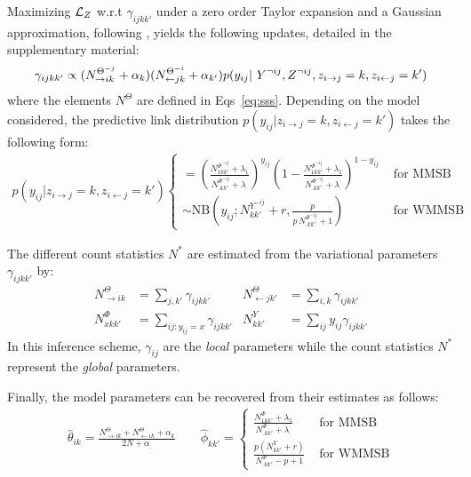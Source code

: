 Maximizing $\mathcal{L}_Z$ w.r.t $\gamma_{ijkk'}$ under a zero order Taylor expansion and a Gaussian approximation, following \cite{teh2006collapsed,asuncion2009smoothing}, yields the following updates, detailed in the supplementary material:
%
\begin{equation} \label{eq:maximization}
\gamma_{ijkk'} \propto (N_{\rightarrow ik}^{\Theta^{-j}} + \alpha_k) (N_{\leftarrow jk}^{\Theta^{-i}} + \alpha_{k'}) p(y_{ij} | Y^{\neg ij}, Z^{\neg ij}, \zij=k, \zji=k')
\end{equation}
%
where the elements $N^{\Theta}$ are defined in Eqs~\eqref{eq:sss}. Depending on the model considered, the predictive link distribution $p(y_{ij}|z_{i \rightarrow j}=k,z_{i \leftarrow j}=k')$ takes the following form:
%
\begin{align*}
p(y_{ij} | z_{i \rightarrow j} = k,z_{i \leftarrow j} = k') \begin{cases}
    = \left( \frac{ N^{\Phi^{-ij}}_{1 kk'} + \lambda_1}{N^{\Phi^{-ij}}_{\bm{.}kk'} + \lambda_{\bm{.}}}\right)^{y_{ij}} \left( 1- \frac{ N^{\Phi^{-ij}}_{1 kk'} + \lambda_1}{N^{\Phi^{-ij}}_{\bm{.}kk'} + \lambda_{\bm{.}}}\right)^{1-y_{ij}}  & \textrm{ for MMSB} \\
    \sim \mathrm{NB}\left(y_{ij}; N^{Y^{-ij}}_{kk'} + r, \frac{p}{p\,N^{\Phi^{-ij}}_{\bm{.}kk'} + 1} \right) & \textrm{ for WMMSB} %
\end{cases}
\end{align*}

The different count statistics $N^*$ are estimated from the variational parameters $\gamma_{ijkk'}$ by:
%
\begin{align} \label{eq:sss}
    N^{\Theta}_{\rightarrow ik} &= \sum_{j, k'} \gamma_{ijkk'}        & N^{\Theta}_{\leftarrow jk'} &= \sum_{i, k} \gamma_{ijkk'}  \nonumber \\
    N^{\Phi}_{xkk'} &= \sum_{ij:y_{ij}=x} \gamma_{ijkk'}  & N^{Y}_{kk'} &= \sum_{ij} y_{ij}\gamma_{ijkk'}
\end{align}
%
In this inference scheme, $\gamma_{ij}$ are the \emph{local} parameters while the count statistics $N^*$ represent the \emph{global} parameters.  

Finally, the model parameters can be recovered from their estimates as follows:
%
\begin{align*}
\hat \theta_{ik} = \frac{N^{\Theta}_{\rightarrow ik} + N^{\Theta}_{\leftarrow ik} + \alpha_k}{2N + \alpha_{\bm{.}}} \qquad 
\hat \phi_{kk'}=\begin{cases}
     \frac{N^{\Phi}_{1 kk'} + \lambda_1}{N^{\Phi}_{\bm{.}kk'} + \lambda_{\bm{.}}} & \textrm{ for MMSB} \\
    \frac{p(N^Y_{kk'} + r)}{N^{\Phi}_{\bm{.}kk'} - p + 1}  & \textrm{ for WMMSB}  %
    \end{cases}
\end{align*}

